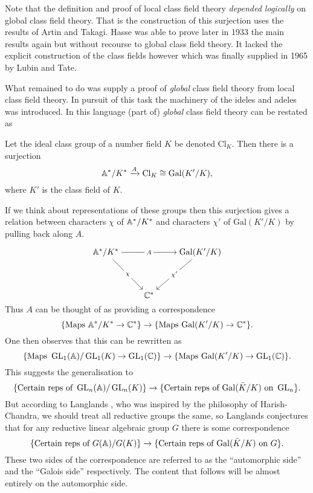 Note that the definition and proof of local class field theory \textit{depended logically} on global class field theory. That is the construction of this surjection uses the results of Artin and Takagi. Hasse was able to prove later in 1933 the main results again but without recourse to global class field theory. It lacked the explicit construction of the class fields however which was finally supplied in 1965 by Lubin and Tate.

What remained to do was supply a proof of \textit{global} class field theory from local class field theory. In pursuit of this task the machinery of the ideles and adeles was introduced. In this language (part of) \textit{global} class field theory can be restated as 
\begin{Theorem}
	Let the ideal class group of a number field \(K\) be denoted \(\mathrm{Cl}_K\). Then there is a surjection
	\[ \A^*/ K^* \xrightarrow{A} \mathrm{Cl}_K \cong \mathrm{Gal}(K'/K),\]
	where \(K'\) is the class field of \(K\).
\end{Theorem}
If we think about representations of these groups then this surjection gives a relation between characters \(\chi\) of \(\A^*/K^*\) and characters \(\chi'\) of \(\mathrm{Gal}(K'/K)\) by pulling back along \(A\).

\[\begin{tikzcd}[cramped]
	{\A^*/K^*} && {\mathrm{Gal}(K'/K)} \\
	\\
	& {\C^*}
	\arrow["A"{description}, from=1-1, to=1-3]
	\arrow["\chi"{description}, from=1-1, to=3-2]
	\arrow["{\chi'}"{description}, from=1-3, to=3-2]
\end{tikzcd}\]
Thus \(A\) can be thought of as providing a correspondence
\[\{\text{Maps }\A^*/K^*\to \C^*\} \to\{ \text{Maps }\mathrm{Gal}(K'/K)\to \C^*\}. \]
One then observes that this can be rewritten as 
\[\{\text{Maps }\GL_1(\A)/\GL_1(K)\to \GL_1(\C)\} \to\{ \text{Maps }\mathrm{Gal}(K'/K)\to \GL_1(\C)\} .\]
This suggests the generalisation to 
\[\{\text{Certain reps of }\GL_n(\A)/\GL_n(K)\} \to\{ \text{Certain reps of  }\mathrm{Gal}(\bar{K}/K)\text{ on } \GL_n\}   .\]
But according to Langlands \cite{langlandsRepresentationTheoryIts1989}, who was inspired by the philosophy of Harish-Chandra, we should treat all reductive groups the same, so Langlands conjectures that for any reductive linear algebraic group \(G\) there is some correspondence
\[\{\text{Certain reps of }G(\A)/G(K)\} \to\{ \text{Certain reps of  }\mathrm{Gal}(\bar{K}/K)\text{ on } G\} .\]
These two sides of the correspondence are referred to as the ``automorphic side'' and the ``Galois side'' respectively. The content that follows will be almost entirely on the automorphic side. 


